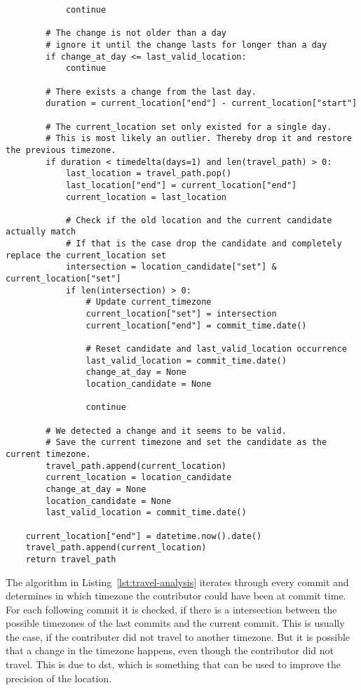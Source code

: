 \begin{verbatim}
            continue

        # The change is not older than a day
        # ignore it until the change lasts for longer than a day
        if change_at_day <= last_valid_location:
            continue

        # There exists a change from the last day.
        duration = current_location["end"] - current_location["start"]

        # The current_location set only existed for a single day.
        # This is most likely an outlier. Thereby drop it and restore the previous timezone.
        if duration < timedelta(days=1) and len(travel_path) > 0:
            last_location = travel_path.pop()
            last_location["end"] = current_location["end"]
            current_location = last_location

            # Check if the old location and the current candidate actually match
            # If that is the case drop the candidate and completely replace the current_location set
            intersection = location_candidate["set"] & current_location["set"]
            if len(intersection) > 0:
                # Update current_timezone
                current_location["set"] = intersection
                current_location["end"] = commit_time.date()

                # Reset candidate and last_valid_location occurrence
                last_valid_location = commit_time.date()
                change_at_day = None
                location_candidate = None

                continue

        # We detected a change and it seems to be valid.
        # Save the current timezone and set the candidate as the current timezone.
        travel_path.append(current_location)
        current_location = location_candidate
        change_at_day = None
        location_candidate = None
        last_valid_location = commit_time.date()

    current_location["end"] = datetime.now().date()
    travel_path.append(current_location)
    return travel_path
\end{verbatim}
\begingroup
{}\label{lst:travel-analysis}
\endgroup

The algorithm in Listing~\ref{lst:travel-analysis} iterates through every commit and determines in which timezone the contributor could have been at commit time.
For each following commit it is checked, if there is a intersection between the possible timezones of the last commits and the current commit.
This is usually the case, if the contributer did not travel to another timezone.
But it is possible that a change in the timezone happens, even though the contributor did not travel.
This is due to \ac{dst}, which is something that can be used to improve the precision of the location.

